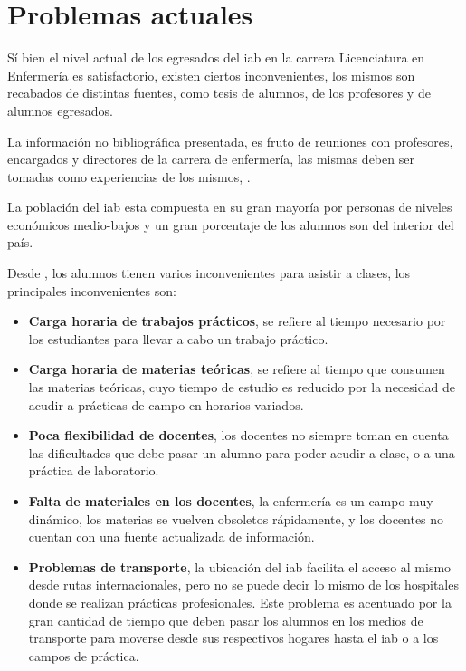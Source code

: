 \section{Problemas actuales}
\label{sec:problemas_actuales}

Sí bien el nivel actual de los egresados del \Gls{iab} en la carrera
Licenciatura en Enfermería es satisfactorio, existen ciertos inconvenientes, los
mismos son recabados de distintas fuentes, como tesis de
alumnos\cite{iab:tesis_alumnos},  de los
profesores y  de alumnos egresados.

La información no bibliográfica presentada, es fruto de reuniones con
profesores, encargados y directores de la carrera de enfermería, las mismas
deben ser tomadas como experiencias de los mismos, .

La población del \Gls{iab} esta compuesta en su gran mayoría por personas de
niveles económicos medio-bajos y un gran porcentaje de los alumnos son del
interior del país.

Desde , los alumnos tienen varios
inconvenientes para asistir a clases, los principales inconvenientes
son\cite{iab:tesis_alumnos}:


\begin{itemize}
    \item \textbf{Carga horaria de trabajos prácticos}, se refiere al tiempo necesario
        por los estudiantes para llevar a cabo un trabajo práctico. 
    \item \textbf{Carga horaria de materias teóricas}, se refiere al tiempo que consumen
        las materias teóricas, cuyo tiempo de estudio es reducido por la
        necesidad de acudir a prácticas de campo en horarios
        variados.
    \item \textbf{Poca flexibilidad de docentes}, los docentes no siempre toman en cuenta
        las dificultades que debe pasar un alumno para poder acudir a clase, o a
        una práctica de laboratorio.
    \item \textbf{Falta de materiales en los docentes}, la enfermería es un campo muy
        dinámico, los materias se vuelven obsoletos rápidamente, y los docentes
        no cuentan con una fuente actualizada de información.
    \item \textbf{Problemas de transporte}, la ubicación del \Gls{iab} facilita el acceso al
        mismo desde rutas internacionales, pero no se puede decir lo mismo de
        los hospitales donde se realizan prácticas profesionales. Este problema
        es acentuado por la gran cantidad de tiempo que deben pasar los alumnos
        en los medios de transporte para moverse desde sus respectivos hogares
        hasta el \Gls{iab} o a los campos de práctica.
\end{itemize}


